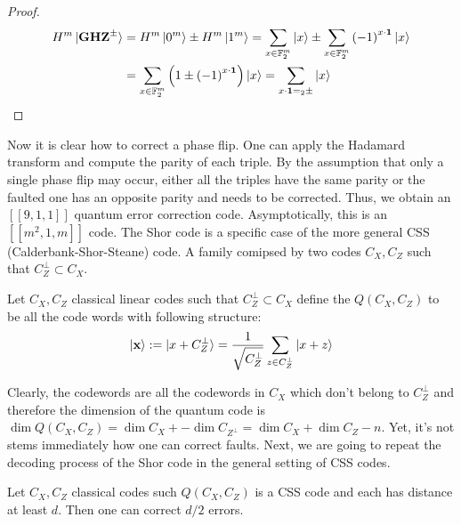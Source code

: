 \begin{proof}

  \begin{equation*}
    \begin{split}
      H^{m}\ket{\mathbf{GHZ}^{\pm}} & = H^{m}\ket{0^{m}} \pm  H^{m}\ket{1^{m}} = \sum_{x \in \mathbb{F}_{2}^{m}}{\ket{x}} \pm  \sum_{x \in \mathbb{F}_{2}^{m}}{\left( -1 \right)^{x \cdot \mathbf{1}} \ket{x}} \\ & = \sum_{x \in \mathbb{F}_{2}^{m}}{ \left( 1 \pm \left( -1 \right)^{x \cdot \mathbf{1}}  \right) \ket{x} } =  \sum_{x \cdot \mathbf{1} =_2 \pm }{\ket{x} }
    \end{split}
  \end{equation*}
\end{proof}

Now it is clear how to correct a phase flip. One can apply the Hadamard transform and compute the parity of each triple. By the assumption that only a single phase flip may occur, either all the triples have the same parity or the faulted one has an opposite parity and needs to be corrected. Thus, we obtain an $\left[ \left[ 9,1,1 \right] \right]$ quantum error correction code. Asymptotically, this is an $\left[ \left[ m^{2}, 1, m \right] \right]$ code. The Shor code is a specific case of the more general CSS (Calderbank-Shor-Steane) code. A family comipsed by two codes $C_{X}, C_{Z}$ such that $C_{Z}^{\perp} \subset C_{X}$. 
\begin{definition}
  Let $C_{X}, C_{Z}$ classical linear codes such that $C_{Z}^{\perp} \subset C_{X}$ define the $Q\left( C_{X},C_{Z} \right)$ to be all the code words with following structure:
  \begin{equation*}
    \begin{split}
    \ket { \mathbf{ x } } := \ket { x + C_{Z}^{\perp} } = \frac{1}{\sqrt{C_{Z}^{\perp}}} \sum_{z \in C_{Z}^{\perp}}{ \ket{ x + z }} 
    \end{split}
  \end{equation*}
\end{definition}
Clearly, the codewords are all the codewords in $C_{X}$ which don't belong to $C_{Z}^{\perp}$ and therefore the dimension of the quantum code is $\dim Q\left( C_{X}, C_{Z} \right) = \dim C_{X} + - \dim C_{Z^{\perp}} = \dim C_{X} + \dim C_{Z} - n$. Yet, it's not stems immediately how one can correct faults. Next, we are going to repeat the decoding process of the Shor code in the general setting of CSS codes.  
\begin{lemma}
  Let $C_{X},C_{Z}$ classical codes such $Q\left( C_{X},C_{Z} \right)$ is a CSS code and each has distance at least $d$. Then one can correct $d/2$ errors.       
\end{lemma}

